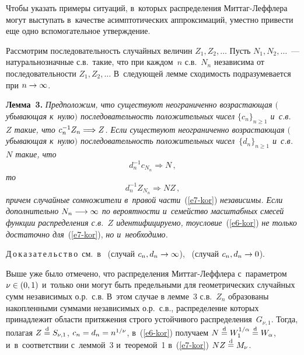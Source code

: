 \begin{multicols}{2}
Чтобы указать примеры ситуаций, в~которых распределения
Мит\-таг-Леф\-фле\-ра могут выступать в~качестве асимптотических
аппроксимаций, уместно привести еще одно вспомогательное
утверж\-дение.

\smallskip

Рассмотрим последовательность случайных величин $Z_1,Z_2,\ldots$ Пусть
$N_1,N_2,\ldots$~--- на\-ту\-раль\-но\-знач\-ные с.в.\
такие, что при каж\-дом~$n$ с.в.~$N_n$ независима от
последовательности $Z_1,Z_2,\ldots$ В~следующей лемме сходимость
подразумевается при $n\hm\to\infty$.

\bigskip

\noindent
\textbf{Лемма~3.} \textit{Предположим, что существуют неограниченно
возрастающая $($убывающая к~нулю$)$ последовательность положительных
чисел $\{c_n\}_{n\geqslant1}$ и~с.в.~$Z$ такие, что
$c_n^{-1}Z_n\hm\Longrightarrow Z$. Если существуют неограниченно
возрастающая $($убывающая к~нулю$)$ последовательность
по\-ло\-жи\-тельных чисел~$\{d_n\}_{n\geqslant1}$ и~с.в.~$N$
такие, что}
\begin{equation}
d_n^{-1}c_{N_n}\Longrightarrow N\,,
\label{e6-kor}
\end{equation}
\textit{то}
\begin{equation}
d_n^{-1}Z_{N_n}\Longrightarrow N  Z\,,
\label{e7-kor}
\end{equation}
\textit{причем случайные сомножители в~правой части}~(\ref{e7-kor}) 
\textit{независимы. Если
дополнительно $N_n\hm\longrightarrow\infty$ по вероятности и~семейство
масштабных смесей функции распределения с.в.~$Z$
идентифицируемо, то}\linebreak \textit{условие}~(\ref{e6-kor}) 
\textit{не только достаточно для}~(\ref{e7-kor}), \textit{но и~необходимо.}


\bigskip

\noindent
Д\,о\,к\,а\,з\,а\,т\,е\,л\,ь\,с\,т\,в\,о\ см.\  в~\cite{Korolev1994} 
(случай $c_n,d_n\hm\to\infty$),~\cite{Korolev1995} (случай $c_n,d_n\hm\to 0$).

\smallskip

Выше уже было отмечено, что распределения Мит\-таг-Леф\-фле\-ра 
с~параметром $\nu\hm\in(0,1)$ и~только они могут быть предельными для
геометрических случайных сумм независимых о.р.\ с.в. В~этом случае
в лемме~3 с.в.~$Z_n$ образованы накопленными суммами независимых 
о.р.\ с.в., распределение которых принадлежит области притяжения
строго устойчивого распределения~$G_{\nu,1}$. Тогда, полагая $Z\hm\eqd
S_{\nu,1}$, $c_n\hm=d_n\hm=n^{1/\nu}$, в~(\ref{e6-kor}) получаем $N\hm\eqd
W_1^{1/\alpha}\hm\eqd W_{\alpha}$, и~в~соответствии с~леммой~3 
и~теоремой~1 в~(\ref{e7-kor}) $N Z\hm\eqd M_{\nu}$.


\end{multicols}

